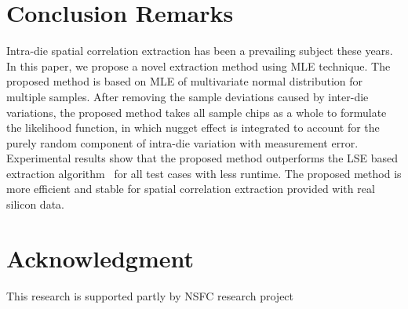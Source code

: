 \documentclass[referee]{ieice}
\begin{document}
\section{Conclusion Remarks}%
Intra-die spatial correlation extraction has been a prevailing subject these years.
In this paper, we propose a novel extraction method using MLE technique.
The proposed method is based on MLE of multivariate normal distribution for multiple samples.
After removing the sample deviations caused by inter-die variations,
the proposed method takes all sample chips as a whole to formulate
the likelihood function, in which nugget effect is integrated to account for
the purely random component of intra-die variation with measurement error.
Experimental results show that the proposed method outperforms the LSE based
extraction algorithm~\cite{Xiong07} for all test cases with less runtime.
The proposed method is more efficient and stable for spatial correlation extraction
provided with real silicon data.


\section*{Acknowledgment}
This research is supported partly by NSFC research project


\end{document}
